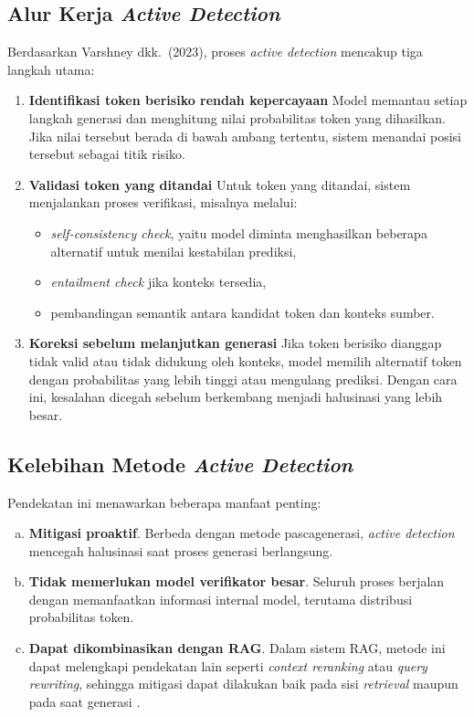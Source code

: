 \subsection{Alur Kerja \textit{Active Detection}}

Berdasarkan Varshney dkk.\ (2023), proses \textit{active detection} mencakup tiga langkah utama:

\begin{enumerate}[1.]
    \item \textbf{Identifikasi token berisiko rendah kepercayaan}
    Model memantau setiap langkah generasi dan menghitung nilai probabilitas token yang dihasilkan. Jika nilai tersebut berada di bawah ambang tertentu, sistem menandai posisi tersebut sebagai titik risiko.

    \item \textbf{Validasi token yang ditandai}
    Untuk token yang ditandai, sistem menjalankan proses verifikasi, misalnya melalui:
    \begin{itemize}
        \item \textit{self-consistency check}, yaitu model diminta menghasilkan beberapa alternatif untuk menilai kestabilan prediksi,
        \item \textit{entailment check} jika konteks tersedia,
        \item pembandingan semantik antara kandidat token dan konteks sumber.
    \end{itemize}

    \item \textbf{Koreksi sebelum melanjutkan generasi}
    Jika token berisiko dianggap tidak valid atau tidak didukung oleh konteks, model memilih alternatif token dengan probabilitas yang lebih tinggi atau mengulang prediksi. Dengan cara ini, kesalahan dicegah sebelum berkembang menjadi halusinasi yang lebih besar.
\end{enumerate}

\subsection{Kelebihan Metode \textit{Active Detection}}

Pendekatan ini menawarkan beberapa manfaat penting:

\begin{enumerate}[a.]
    \item \textbf{Mitigasi proaktif}.
    Berbeda dengan metode pascagenerasi, \textit{active detection} mencegah halusinasi saat proses generasi berlangsung.

    \item \textbf{Tidak memerlukan model verifikator besar}.
    Seluruh proses berjalan dengan memanfaatkan informasi internal model, terutama distribusi probabilitas token.

    \item \textbf{Dapat dikombinasikan dengan RAG}.
    Dalam sistem RAG, metode ini dapat melengkapi pendekatan lain seperti \textit{context reranking} atau \textit{query rewriting}, sehingga mitigasi dapat dilakukan baik pada sisi \textit{retrieval} maupun pada saat generasi \parencite{math2024hallucination}.
\end{enumerate}

